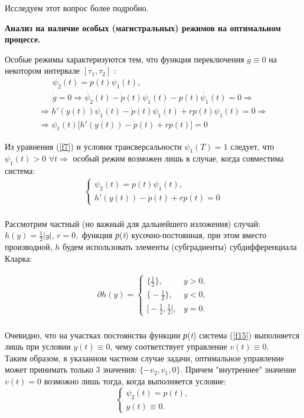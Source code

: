 Исследуем этот вопрос более подробно.

\textbf{Анализ на наличие особых (магистральных) режимов на оптимальном процессе.}

Особые режимы характеризуются тем, что функция переключения $g \equiv 0$ на некотором интервале $[\tau_1, \tau_2]$ :
\begin{gather*}
  \psi_2 (t) = p(t) \psi_1 (t),\\
   \Dot{g} = 0 \Rightarrow  \Dot{\psi_2}(t) - \Dot{p}(t) \psi_1 (t) - p(t) \Dot{\psi_1}(t) = 0 \Rightarrow 
   \end{gather*}
   \begin{gather*}
  \Rightarrow h'(y(t)) \psi_1 (t) -   \Dot{p}(t) \psi_1 (t) + r p(t) {\psi_1}(t) = 0 \Rightarrow \\
  \Rightarrow  \psi_1 (t) \big[  h'(y(t)) -   \Dot{p}(t) + r p(t) \big] = 0 
\end{gather*}



Из уравнения (\ref{f7}) и условия трансверсальности $\psi_1(T)= 1$ следует, что $\psi_1(t)>0$  $ \forall t  \Rightarrow$ особый режим возможен лишь в случае, когда совместима система:\\
\begin{align}
 \begin{cases}
\psi_2(t) = p(t)\psi_1(t),  \\
h'(y(t)) - \Dot{p}(t)+r p(t) = 0
\end{cases}
\end{align}\\

Рассмотрим частный (но важный для дальнейшего изложения) случай:  $ {h(y)} = \frac{1}{2}|y|$, $ {r} = 0, $ функция \emph {р}(\emph{t}) кусочно-постоянная, при этом вместо производной, $h$ будем использовать элементы (субградиенты) субдифференциала Кларка:

\begin{align} \label{f15}
\partial h(y) =
 \begin{cases}
 \big\{\frac{1}{2}\big\}, & y>0,  \\
 \big\{-\frac{1}{2}\big\},& y<0, \\
\big[-\frac{1}{2}, \frac{1}{2} \big],& y=0.
\end{cases}
\end{align}\\



Очевидно, что на участках постоянства функции \emph {р}(\emph{t}) система (\ref{f15}) выполняется лишь при условии $ y(t) \equiv 0$, чему соответствует управление $ v(t) \equiv 0$.\\
Таким образом, в указанном частном случае задачи, оптимальное управление может принимать только 3 значения: $ \{ - v_2, v_1, 0\}$. Причем "внутреннее" значение $v(t) = 0$ возможно лишь тогда, когда выполняется условие:
\begin{displaymath}
\left\{ \begin{array}{ll}
 \psi_2(t) = p(t),\\
 y(t) \equiv 0.
  \end{array} \right.
\end{displaymath}

